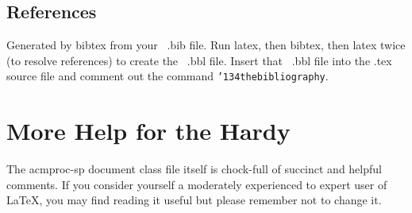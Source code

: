 \documentclass{sigkddExp}
\begin{document}
\subsection{References}
Generated by bibtex from your ~.bib file.  Run latex,
then bibtex, then latex twice (to resolve references)
to create the ~.bbl file.  Insert that ~.bbl file into
the .tex source file and comment out
the command \texttt{{\char'134}thebibliography}.
\section{More Help for the Hardy}
The acmproc-sp document class file itself is chock-full of succinct
and helpful comments.  If you consider yourself a moderately
experienced to expert user of \LaTeX, you may find reading
it useful but please remember not to change it.

\end{document}
